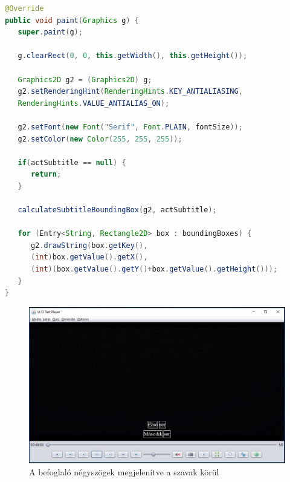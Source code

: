 \begin{spacing}{1.25}
\begin{lstlisting}[caption=A felirat megjelenítése, language=java, label={lst:felirat_megj}]
@Override
public void paint(Graphics g) {
   super.paint(g);

   g.clearRect(0, 0, this.getWidth(), this.getHeight());

   Graphics2D g2 = (Graphics2D) g;
   g2.setRenderingHint(RenderingHints.KEY_ANTIALIASING,
   RenderingHints.VALUE_ANTIALIAS_ON);

   g2.setFont(new Font("Serif", Font.PLAIN, fontSize));
   g2.setColor(new Color(255, 255, 255));

   if(actSubtitle == null) {
      return;
   }
   
   calculateSubtitleBoundingBox(g2, actSubtitle);

   for (Entry<String, Rectangle2D> box : boundingBoxes) {
      g2.drawString(box.getKey(),
      (int)box.getValue().getX(),
      (int)(box.getValue().getY()+box.getValue().getHeight()));
   }
}
\end{lstlisting}
\end{spacing}

\begin{figure}[h!]
  \includegraphics[width=\linewidth]{images/subtitle_boxes.jpg}
  \caption{A befoglaló négyszögek megjelenítve a szavak körül}
  \label{fig:subtitle_boxes}
\end{figure}

